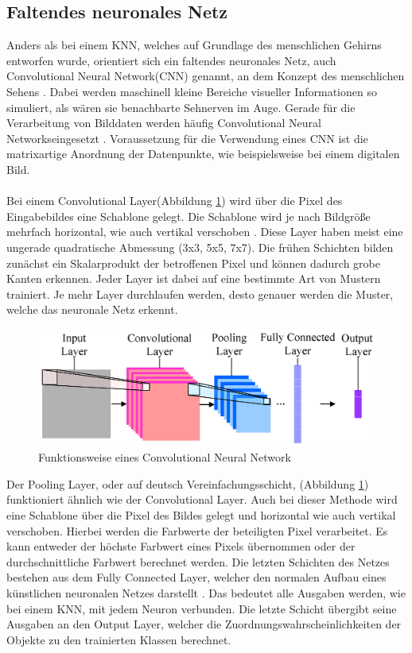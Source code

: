 \documentclass[a4paper,12pt,oneside]{article}
\begin{document}
  \subsection{Faltendes neuronales Netz}
Anders als bei einem KNN, welches auf Grundlage des menschlichen Gehirns entworfen wurde, orientiert sich ein faltendes neuronales Netz, auch \glqq Convolutional Neural Network\grqq (CNN) genannt, an dem Konzept des menschlichen Sehens \cite{lecun1989backpropagation}. Dabei werden maschinell kleine Bereiche visueller Informationen so simuliert, als wären sie benachbarte Sehnerven im Auge. Gerade für die Verarbeitung von Bilddaten werden häufig \glqq Convolutional Neural Networks\grqq eingesetzt \cite[326]{goodfellow2016deep}. Voraussetzung für die Verwendung eines CNN ist die matrixartige Anordnung der Datenpunkte, wie beispielsweise bei einem digitalen Bild.
\\
\\
Bei einem \glqq Convolutional Layer\grqq (Abbildung \ref{img:CNN}) wird über die Pixel des Eingabebildes eine Schablone gelegt. Die Schablone wird je nach Bildgröße mehrfach horizontal, wie auch vertikal verschoben \cite[327-335]{goodfellow2016deep}. Diese Layer haben meist eine ungerade quadratische Abmessung (3x3, 5x5, 7x7). Die frühen Schichten bilden zunächst ein Skalarprodukt der betroffenen Pixel und können dadurch grobe Kanten erkennen. Jeder Layer ist dabei auf eine bestimmte Art von Mustern trainiert. Je mehr Layer durchlaufen werden, desto genauer werden die Muster, welche das neuronale Netz erkennt.

\begin{figure}
    [h]
	\centering
	\includegraphics[scale=1.5]{Sources/cnn2.png}
		\caption{Funktionsweise eines Convolutional Neural Network\cite{info7040061}}
	\label{img:CNN}
\end{figure}

Der \glqq Pooling Layer\grqq, oder auf deutsch Vereinfachungsschicht, (Abbildung \ref{img:CNN}) funktioniert ähnlich wie der \glqq Convolutional Layer\grqq \cite[336f.]{goodfellow2016deep}. Auch bei dieser Methode wird eine Schablone über die Pixel des Bildes gelegt und horizontal wie auch vertikal verschoben. Hierbei werden die Farbwerte der beteiligten Pixel verarbeitet. Es kann entweder der höchste Farbwert eines Pixels übernommen oder der durchschnittliche Farbwert berechnet werden. Die letzten Schichten des Netzes bestehen aus dem \glqq Fully Connected Layer\grqq, welcher den normalen Aufbau eines künstlichen neuronalen Netzes darstellt \cite[14]{lecun1989backpropagation}. Das bedeutet alle Ausgaben werden, wie bei einem KNN, mit jedem Neuron verbunden. Die letzte Schicht übergibt seine Ausgaben an den Output Layer, welcher die Zuordnungswahrscheinlichkeiten der Objekte zu den trainierten Klassen berechnet.
\end{document}
